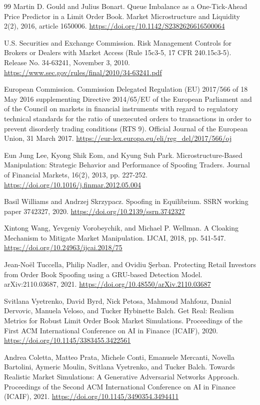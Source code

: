 \documentclass{article}
\begin{document}
\begin{thebibliography}{99}
 Martin D. Gould and Julius Bonart. Queue Imbalance as a One-Tick-Ahead Price Predictor in a Limit Order Book. Market Microstructure and Liquidity 2(2), 2016, article 1650006.
\url{https://doi.org/10.1142/S2382626616500064}

 U.S. Securities and Exchange Commission. Risk Management Controls for Brokers or Dealers with Market Access (Rule 15c3-5, 17 CFR 240.15c3-5). Release No. 34-63241, November 3, 2010.
\url{https://www.sec.gov/rules/final/2010/34-63241.pdf}

 European Commission. Commission Delegated Regulation (EU) 2017/566 of 18 May 2016 supplementing Directive 2014/65/EU of the European Parliament and of the Council on markets in financial instruments with regard to regulatory technical standards for the ratio of unexecuted orders to transactions in order to prevent disorderly trading conditions (RTS 9). Official Journal of the European Union, 31 March 2017.
\url{https://eur-lex.europa.eu/eli/reg_del/2017/566/oj}

 Eun Jung Lee, Kyong Shik Eom, and Kyung Suh Park. Microstructure-Based Manipulation: Strategic Behavior and Performance of Spoofing Traders. Journal of Financial Markets, 16(2), 2013, pp. 227-252.
\url{https://doi.org/10.1016/j.finmar.2012.05.004}

 Basil Williams and Andrzej Skrzypacz. Spoofing in Equilibrium. SSRN working paper 3742327, 2020.
\url{https://doi.org/10.2139/ssrn.3742327}

 Xintong Wang, Yevgeniy Vorobeychik, and Michael P. Wellman. A Cloaking Mechanism to Mitigate Market Manipulation. IJCAI, 2018, pp. 541-547.
\url{https://doi.org/10.24963/ijcai.2018/75}

 Jean-No\"{e}l Tuccella, Philip Nadler, and Ovidiu \c{S}erban. Protecting Retail Investors from Order Book Spoofing using a GRU-based Detection Model. arXiv:2110.03687, 2021.
\url{https://doi.org/10.48550/arXiv.2110.03687}

 Svitlana Vyetrenko, David Byrd, Nick Petosa, Mahmoud Mahfouz, Danial Dervovic, Manuela Veloso, and Tucker Hybinette Balch. Get Real: Realism Metrics for Robust Limit Order Book Market Simulations. Proceedings of the First ACM International Conference on AI in Finance (ICAIF), 2020.
\url{https://doi.org/10.1145/3383455.3422561}

 Andrea Coletta, Matteo Prata, Michele Conti, Emanuele Mercanti, Novella Bartolini, Aymeric Moulin, Svitlana Vyetrenko, and Tucker Balch. Towards Realistic Market Simulations: A Generative Adversarial Networks Approach. Proceedings of the Second ACM International Conference on AI in Finance (ICAIF), 2021.
\url{https://doi.org/10.1145/3490354.3494411}

\end{thebibliography}
\end{document}
